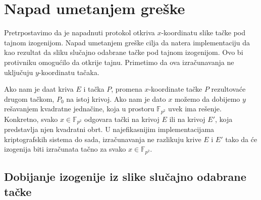 \documentclass[a4paper]{article}
\begin{document}

\section{Napad umetanjem greške}

Pretrpostavimo da je napadnuti protokol otkriva $x$-koordinatu slike tačke pod tajnom izogenijom. Napad umetanjem greške cilja da natera implementaciju da kao rezultat da sliku slučajno odabrane tačke pod tajnom izogenijom. Ovo bi protivniku omogućilo da otkrije tajnu. Primetimo da ova izračunavanja ne uključuju $y$-koordinatu tačaka. 

Ako nam je daat kriva $E$ i tačka $P$, promena $x$-koordinate tačke $P$ rezultovaće drugom tačkom, $P_0$ na istoj krivoj. Ako nam je dato $x$ možemo da dobijemo $y$ rešavanjem kvadratne jednačine, koja u prostoru $\mathbb{F}_{p^2}$ uvek ima rešenje. Konkretno, svako $x \in \mathbb{F}_{p^2}$ odgovara tački na krivoj $E$ ili na krivoj $E'$, koja predstavlja njen kvadratni obrt. U najefikasnijim implementacijama kriptografskih sistema do sada, izračunavanja ne razlikuju krive $E$ i $E'$ tako da će izogenija biti izračunata tačno za svako $x \in \mathbb{F}_{p^2}$. 


\subsection{Dobijanje izogenije iz slike slučajno odabrane tačke}
\end{document}
